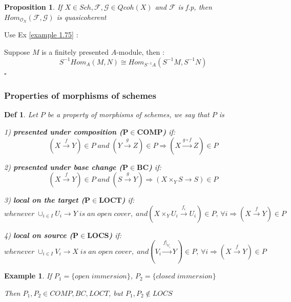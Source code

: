 \documentclass{article}
\newtheorem{definition}[theorem]{Def}
\newtheorem{example}[theorem]{Example}
\newtheorem{proposition}[theorem]{Proposition}
\newenvironment{Proof}{{\noindent \indent \it Proof:\quad}}{\hfill $\square$\par}
\begin{document}
\begin{proposition}
    If $X\in Sch,\mathcal F,\mathcal G\in Qcoh(X)$ and $\mathcal F$ is f.p, then $Hom_{\mathcal O_X}(\mathcal F,\mathcal G)$ is quasicoherent
\end{proposition}
\label{prop 3.117}
\begin{Proof}
Use Ex \ref{example 1.75} :

Suppose $M$ is a finitely presented $A$-module, then :
\begin{equation*}
S^{-1} Hom_A(M, N) \cong Hom_{S^{-1}A}(S^{-1}M, S^{-1}N)
\end{equation*}
\end{Proof}

\subsubsection{Properties of morphisms of schemes}
\begin{definition}
    Let $P$ be a property of morphisms of schemes, we say that $P$ is 

    1) \textbf{presented under composition ($\bm{P\in COMP}$)} if:
    $$
    (X \xrightarrow {f}Y)\in P\;and\; (Y \xrightarrow {g}Z)\in P \Rightarrow
    (X\xrightarrow{g\circ f}Z)\in P
    $$

    2) \textbf{presented under base change ($\bm{P\in BC}$)} if:
    $$
    (X \xrightarrow {f}Y)\in P
    \;and\; 
    (S \xrightarrow {g}Y) \Rightarrow
    (X\times_Y S\to S)\in P
    $$

    3) \textbf{local on the target ($\bm{P\in LOCT}$)} if:
    $$
    whenever \;\cup_{i\in I}U_i\to Y \; is \; an \; open \;cover,\; and
    (X\times_Y U_i \xrightarrow{f_i} U_i)\in P,\,\forall i
    \Rightarrow
    (X \xrightarrow {f}Y)\in P
    $$

    4) \textbf{local on source ($\bm{P\in LOCS}$)} if:
    $$
    whenever \;\cup_{i\in I}V_i\to X \; is \; an \; open \;cover,\; and
    (V_i\xrightarrow {f|_{V_i}} Y)\in P,\,\forall i
    \Rightarrow
    (X \xrightarrow {f}Y)\in P
    $$
\end{definition}

\begin{example}
    If $P_1=\{open\;immersion\}$, $P_2=\{closed\;immersion\}$
    
    Then $P_1,P_2\in COMP,BC,LOCT$, but
    $P_1,P_2\notin LOCS$
\end{example}
\end{document}
